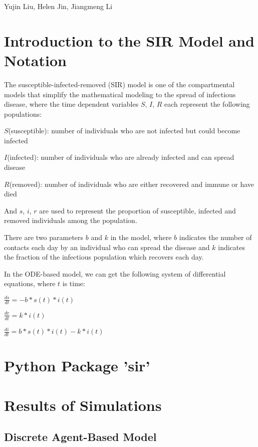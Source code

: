 \documentclass{article}
\begin{document}
\begin{titlepage}
  \begin{center}
  \huge{Yujin Liu, Helen Jin, Jiangmeng Li}
  \end{center}


\end{titlepage}


\section{Introduction to the SIR Model and Notation}
The susceptible-infected-removed (SIR) model is one of the compartmental models that simplify the mathematical modeling to the spread of infectious disease, where the time dependent variables $S$, $I$, $R$ each represent the following populations:

$S$(susceptible): number of individuals who are not infected but could become infected

$I$(infected): number of individuals who are already infected and can spread disease

$R$(removed): number of individuals who are either recovered and immune or have died

And $s$, $i$, $r$ are used to represent the proportion of susceptible, infected and removed individuals among the population.

There are two parameters $b$ and $k$ in the model, where $b$ indicates the number of contacts each day by an individual who can spread the disease and $k$ indicates the fraction of the infectious population which recovers each day.

In the ODE-based model, we can get the following system of differential equations, where $t$ is time:

$\frac{ds}{dt} = -b * s(t) * i(t)$

$\frac{dr}{dt} = k * i(t)$

$\frac{di}{dt} = b * s(t) * i(t) - k * i(t)$
\section{Python Package 'sir'}


\section{Results of Simulations}
\subsection{Discrete Agent-Based Model}
\end{document}
